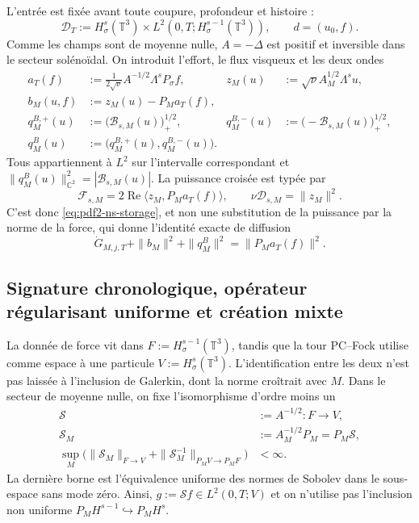 L'entrée est fixée avant toute coupure, profondeur et histoire :
\begin{equation}\label{eq:pdf2-ns-data-space}
 \mathcal D_T:=H^s_\sigma(\mathbb T^3)
 \times L^2(0,T;H^{s-1}_\sigma(\mathbb T^3)),
 \qquad d=(u_0,f).
\end{equation}
Comme les champs sont de moyenne nulle, $A=-\Delta$ est positif et inversible dans le
secteur solénoïdal. On introduit l'effort, le flux visqueux et les deux ondes
\begin{equation}\label{eq:pdf2-ns-force-waves}
 \begin{aligned}
 a_T(f)&:=\frac{1}{2\sqrt\nu}A^{-1/2}\Lambda^sP_\sigma f,
 &z_M(u)&:=\sqrt\nu A_M^{1/2}\Lambda^su,\\
 b_M(u,f)&:=z_M(u)-P_Ma_T(f),\\
 q_M^{B,+}(u)&:=\bigl(\mathscr B_{s,M}(u)\bigr)_+^{1/2},
 &q_M^{B,-}(u)&:=\bigl(-\mathscr B_{s,M}(u)\bigr)_+^{1/2},\\
 q_M^B(u)&:=\bigl(q_M^{B,+}(u),q_M^{B,-}(u)\bigr).
 \end{aligned}
\end{equation}
Tous appartiennent à $L^2$ sur l'intervalle correspondant et
$\|q_M^B(u)\|_{\mathbb C^2}^2=|\mathscr B_{s,M}(u)|$.
La puissance croisée est typée par
\begin{equation}\label{eq:pdf2-ns-cross-power}
 \mathscr F_{s,M}=2\operatorname{Re}\langle z_M,P_Ma_T(f)\rangle,
 \qquad \nu\mathscr D_{s,M}=\|z_M\|^2.
\end{equation}
C'est donc \eqref{eq:pdf2-ns-storage}, et non une substitution de la puissance par la
norme de la force, qui donne l'identité exacte de diffusion
\begin{equation}\label{eq:pdf2-ns-scattering-balance}
 \dot G_{M,j,T}+\|b_M\|^2+\|q^B_M\|^2=\|P_Ma_T(f)\|^2.
\end{equation}

\subsection{Signature chronologique, opérateur régularisant uniforme et création mixte}

La donnée de force vit dans $F:=H^{s-1}_\sigma(\mathbb T^3)$, tandis que la
tour PC--Fock utilise comme espace à une particule
$V:=H^s_\sigma(\mathbb T^3)$. L'identification entre les deux n'est pas laissée à
l'inclusion de Galerkin, dont la norme croîtrait avec $M$. Dans le secteur de moyenne nulle, on
fixe l'isomorphisme d'ordre moins un
\begin{equation}\label{eq:pdf2-ns-uniform-smoother}
 \begin{aligned}
 \mathscr S&:=A^{-1/2}:F\longrightarrow V,\\
 \mathscr S_M&:=A_M^{-1/2}P_M=P_M\mathscr S,\\
 \sup_M\bigl(\|\mathscr S_M\|_{F\to V}
 +\|\mathscr S_M^{-1}\|_{P_MV\to P_MF}\bigr)&<\infty.
 \end{aligned}
\end{equation}
La dernière borne est l'équivalence uniforme des normes de Sobolev dans le
sous-espace sans mode zéro. Ainsi, $g:=\mathscr Sf\in L^2(0,T;V)$ et on n'utilise pas
l'inclusion non uniforme $P_MH^{s-1}\hookrightarrow P_MH^s$.

